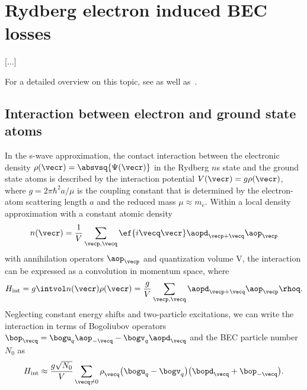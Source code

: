 \chapter{Rydberg electron induced BEC losses}
\label{rydberg_losses}

[...]

For a detailed overview on this topic, see  as well as~\cite{Karpiuk2014,Gaj2014}.






\section{Interaction between electron and ground state atoms}

In the s-wave approximation, the contact interaction between the electronic density $\rho(\vecr)=\absvsq{\Psi(\vecr)}$ in the Rydberg $n$s state and the ground state atoms is described by the interaction potential $V(\vecr)=g \rho(\vecr)$, where $g=2\pi \hbar^2 a/\mu$ is the coupling constant that is determined by the electron-atom scattering length $a$ and the reduced mass $\mu \approx m_e$. Within a local density approximation with a constant atomic density
\begin{align}
    n(\vecr)=\frac{1}{V} \sum_{\vecp,\vecq} \ef{i\vecq\vecr}\aopd_{\vecp+\vecq} \aop_{\vecp}
\end{align}
with annihilation operators $\aop_{\vecp}$ and quantization volume V, the interaction can be expressed as a convolution in momentum space, where
\begin{align}
H_\text{int} = g\intvol n(\vecr)\rho(\vecr) = \frac{g}{V} \sum_{\vecp,\vecq} \aopd_{\vecp+\vecq} \aop_{\vecp} \rhoq.
\end{align}
Neglecting constant energy shifts and two-particle excitations, we can write the interaction in terms of Bogoliubov operators $\bop_{\vecq}=\bogu_q \aop_{-\vecq} - \bogv_q \aopd_{\vecq}$ and the BEC particle number $N_0$ as
\begin{align}
H_\text{int}\approx\frac{g\sqrt{N_0}}{V} \sum_{\vecq\ne 0} \rho^{\phantom\dagger}_{\vecq} \big(\bogu_{q}-\bogv_{q}\big) \big(\bopd_{\vecq}+\bop_{-\vecq}\big).
\end{align}
